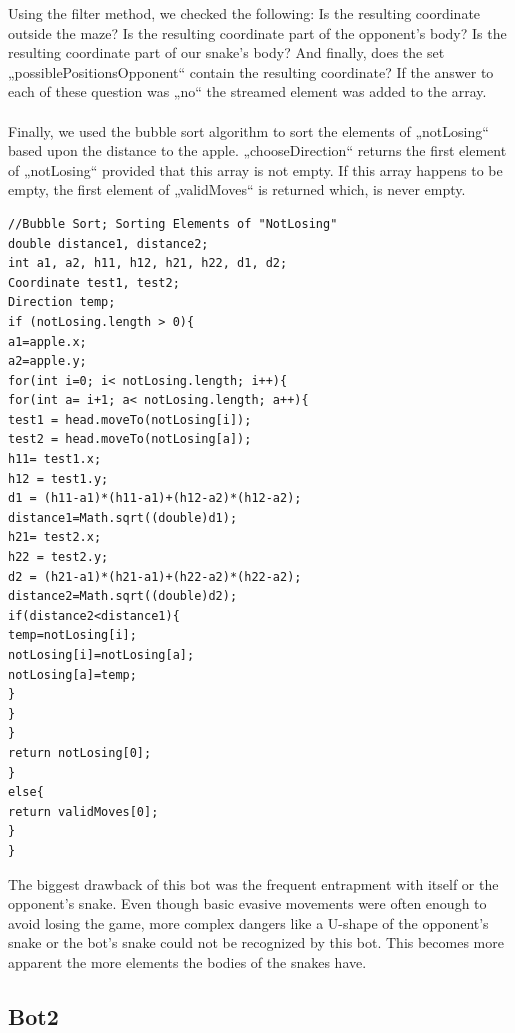 \documentclass[a4paper,12pt]{article}
\begin{document}
Using the filter method, we checked the following: Is the resulting coordinate outside the
maze? Is the resulting coordinate part of the opponent’s body? Is the resulting coordinate
part of our snake’s body? And finally, does the set „possiblePositionsOpponent“ contain the
resulting coordinate? If the answer to each of these question was „no“ the streamed element
was added to the array.\\
\\
Finally, we used the bubble sort algorithm to sort the elements of „notLosing“ based upon
the distance to the apple. „chooseDirection“ returns the first element of „notLosing“
provided that this array is not empty. If this array happens to be empty, the first element of
„validMoves“ is returned which, is never empty.
\begin{verbatim}
//Bubble Sort; Sorting Elements of "NotLosing"
double distance1, distance2;
int a1, a2, h11, h12, h21, h22, d1, d2;
Coordinate test1, test2;
Direction temp;
if (notLosing.length > 0){
a1=apple.x;
a2=apple.y;
for(int i=0; i< notLosing.length; i++){
for(int a= i+1; a< notLosing.length; a++){
test1 = head.moveTo(notLosing[i]);
test2 = head.moveTo(notLosing[a]);
h11= test1.x;
h12 = test1.y;
d1 = (h11-a1)*(h11-a1)+(h12-a2)*(h12-a2);
distance1=Math.sqrt((double)d1);
h21= test2.x;
h22 = test2.y;
d2 = (h21-a1)*(h21-a1)+(h22-a2)*(h22-a2);
distance2=Math.sqrt((double)d2);
if(distance2<distance1){
temp=notLosing[i];
notLosing[i]=notLosing[a];
notLosing[a]=temp;
}
}
}
return notLosing[0];
}
else{
return validMoves[0];
}
}
\end{verbatim}
The biggest drawback of this bot was the frequent entrapment with itself or the opponent's snake. Even though basic evasive movements were often enough to avoid losing the game, more complex dangers like a U-shape of the opponent's snake or the bot’s snake could not be recognized by this bot. This becomes more apparent the more elements the bodies of the snakes have.\\
\subsection{Bot2}
\end{document}
